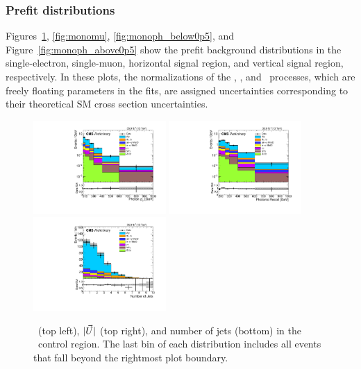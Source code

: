 \subsubsection{Prefit distributions}
Figures~\ref{fig:monoel}, \ref{fig:monomu}, \ref{fig:monoph_below0p5}, and Figure~\ref{fig:monoph_above0p5} show the prefit
background distributions in the single-electron, single-muon, horizontal signal region, and vertical signal region, respectively.
In these plots, the normalizations of the \zinvg, \wlng, and \zllg\ processes,
which are freely floating parameters in the fits, are assigned uncertainties corresponding to their theoretical SM cross section uncertainties.

\begin{figure}[htbp]
  \begin{center}
    \includegraphics[width=0.45\textwidth]{Figures/results/weng_phoPt.pdf}
    \includegraphics[width=0.45\textwidth]{Figures/results/weng_recoil.pdf}
    \includegraphics[width=0.45\textwidth]{Figures/results/weng_nJet.pdf}
    \caption{
      \ETgamma\ (top left), $|\vec{U}|$ (top right), and number of jets (bottom) in the \Pe\Pgamma\ control region.
      The last bin of each distribution includes all events that fall beyond the rightmost plot boundary.
    }
    \label{fig:monoel}
  \end{center}
\end{figure}

